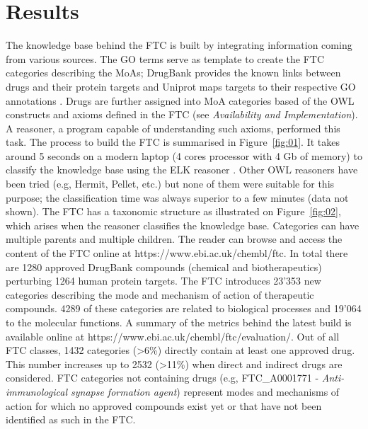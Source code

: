\documentclass{bioinfo}
\begin{document}
\section{Results}

The knowledge base behind the FTC is built by integrating information coming from various sources. 
The GO terms serve as template to create the FTC categories describing the MoAs; DrugBank \citep{Knox2011} provides the 
known links between drugs and their protein targets and Uniprot \citep{TheUniprotConsortium2013} maps targets to their 
respective GO annotations \citep{Dimmer2012}. 
Drugs are further assigned into MoA categories based of the OWL constructs and axioms defined in the 
FTC (see \emph{Availability and Implementation}). A reasoner, a program capable of understanding such axioms, performed this task. 
The process to build the FTC is summarised in Figure~\ref{fig:01}.
It takes around 5 seconds on a modern 
laptop (4 cores processor with 4 Gb of memory) to classify the knowledge base using the ELK reasoner \citep{Kazakov2011}. 
Other OWL reasoners have been tried (e.g, Hermit, Pellet, etc.) but none of them were suitable for this purpose; 
the classification time was always superior to a few minutes (data not shown). The FTC has a taxonomic structure as illustrated 
on Figure~\ref{fig:02}, which arises when the reasoner classifies the knowledge base. Categories can have multiple parents and multiple children. 
The reader can browse and access the content of the FTC online at {{https://www.ebi.ac.uk/chembl/ftc}}.
In total there are 1280 approved DrugBank compounds (chemical and biotherapeutics) perturbing 1264 human protein targets. 
The FTC introduces 23'353 new categories describing the mode and mechanism of action of therapeutic compounds. 4289 of these 
categories are related to biological processes and 19'064 to the molecular functions. A summary of the metrics behind the latest 
build is available online at {{https://www.ebi.ac.uk/chembl/ftc/evaluation/}}. Out of all FTC classes, 1432 
categories (\textgreater 6\%) directly contain at least one approved drug. This number increases up to 2532 (\textgreater 11\%) 
when direct and 
indirect drugs are considered. FTC categories not containing drugs (e.g, FTC\_A0001771 - \emph{Anti-immunological synapse 
formation agent}) represent modes and mechanisms of action for which no approved compounds exist yet or that have not been identified 
as such in the FTC.
\end{document}
